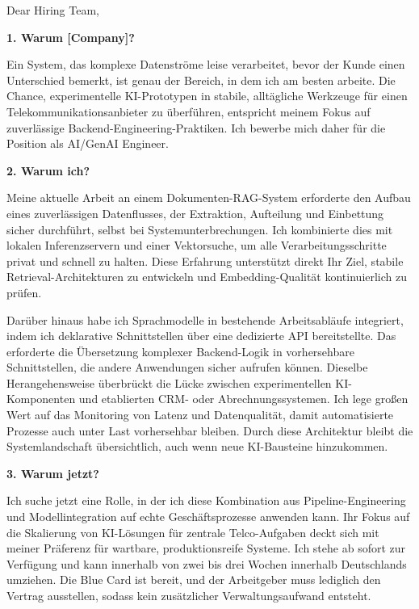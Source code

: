 \documentclass[11pt,a4paper]{coverletter}
\begin{document}

\opening{Dear Hiring Team,}

\vspace{8pt}\noindent\textbf{1. Warum [Company]?}\par\vspace{3pt}

Ein System, das komplexe Datenströme leise verarbeitet, bevor der Kunde einen Unterschied bemerkt, ist genau der Bereich, in dem ich am besten arbeite. Die Chance, experimentelle KI-Prototypen in stabile, alltägliche Werkzeuge für einen Telekommunikationsanbieter zu überführen, entspricht meinem Fokus auf zuverlässige Backend-Engineering-Praktiken. Ich bewerbe mich daher für die Position als AI/GenAI Engineer.

\vspace{8pt}\noindent\textbf{2. Warum ich?}\par\vspace{3pt}

Meine aktuelle Arbeit an einem Dokumenten-RAG-System erforderte den Aufbau eines zuverlässigen Datenflusses, der Extraktion, Aufteilung und Einbettung sicher durchführt, selbst bei Systemunterbrechungen. Ich kombinierte dies mit lokalen Inferenzservern und einer Vektorsuche, um alle Verarbeitungsschritte privat und schnell zu halten. Diese Erfahrung unterstützt direkt Ihr Ziel, stabile Retrieval-Architekturen zu entwickeln und Embedding-Qualität kontinuierlich zu prüfen.

Darüber hinaus habe ich Sprachmodelle in bestehende Arbeitsabläufe integriert, indem ich deklarative Schnittstellen über eine dedizierte API bereitstellte. Das erforderte die Übersetzung komplexer Backend-Logik in vorhersehbare Schnittstellen, die andere Anwendungen sicher aufrufen können. Dieselbe Herangehensweise überbrückt die Lücke zwischen experimentellen KI-Komponenten und etablierten CRM- oder Abrechnungssystemen. Ich lege großen Wert auf das Monitoring von Latenz und Datenqualität, damit automatisierte Prozesse auch unter Last vorhersehbar bleiben. Durch diese Architektur bleibt die Systemlandschaft übersichtlich, auch wenn neue KI-Bausteine hinzukommen.

\vspace{8pt}\noindent\textbf{3. Warum jetzt?}\par\vspace{3pt}

Ich suche jetzt eine Rolle, in der ich diese Kombination aus Pipeline-Engineering und Modellintegration auf echte Geschäftsprozesse anwenden kann. Ihr Fokus auf die Skalierung von KI-Lösungen für zentrale Telco-Aufgaben deckt sich mit meiner Präferenz für wartbare, produktionsreife Systeme. Ich stehe ab sofort zur Verfügung und kann innerhalb von zwei bis drei Wochen innerhalb Deutschlands umziehen. Die Blue Card ist bereit, und der Arbeitgeber muss lediglich den Vertrag ausstellen, sodass kein zusätzlicher Verwaltungsaufwand entsteht.
\end{document}

